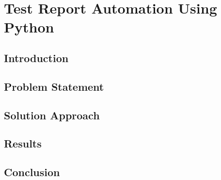 \chapter{Test Report Automation Using Python}

\section{Introduction}
\lipsum[1-2] %

\section{Problem Statement}
\lipsum[3] %

\section{Solution Approach}
\lipsum[4] %

\section{Results}
\lipsum[5] %

\section{Conclusion}
\lipsum[6] %
